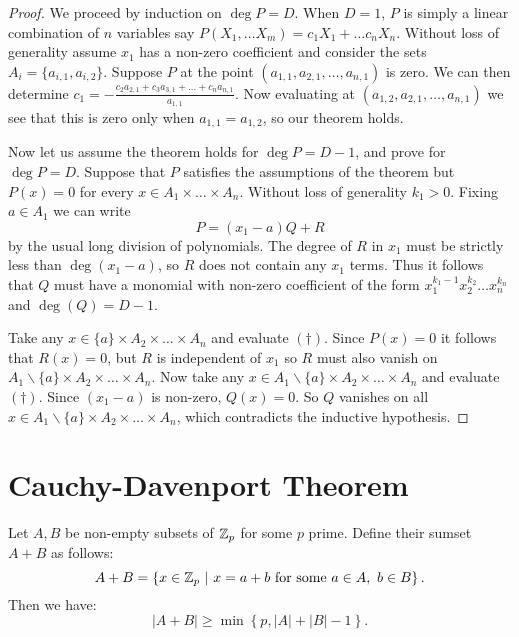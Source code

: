 \begin{proof}
    We proceed by induction on $\deg P = D$. When $D=1$, $P$ is simply a linear combination of $n$ variables say $P(X_1,\dots X_m) = c_1 X_1 + \dots c_n X_n$. Without loss of generality assume $x_1$ has a non-zero coefficient and consider the sets $A_i = \{a_{i,1}, a_{i,2}\}$. Suppose $P$ at the point $(a_{1,1}, a_{2,1}, \dots, a_{n,1})$ is zero. We can then determine $c_{1} =- \frac{c_2 a_{2,1} + c_3 a_{3,1}+\dots+ c_n a_{n,1}}{a_{1,1}}$. Now evaluating at $(a_{1,2}, a_{2,1}, \dots, a_{n,1})$ we see that this is zero only when $a_{1,1} = a_{1,2}$, so our theorem holds. 

    Now let us assume the theorem holds for $\deg P = D -1$, and prove for $\deg P = D$.
    Suppose that $P$ satisfies the assumptions of the theorem but $P(x) = 0$ for every $x \in A_1 \times \dots \times A_n$.
    Without loss of generality $k_1 > 0.$ Fixing $a\in A_1$ we can write
    \[
    P = (x_1-a)Q +R  \tag{$\dagger$}
    \]
    by the usual long division of polynomials. The degree of $R$ in $x_1$ must be strictly less than $\deg(x_1-a)$, so $R$ does not contain any
    $x_1$ terms. Thus it follows that $Q$ must have a monomial with non-zero coefficient of the form $x_1^{k_{1} -1} x_2^{k_2} \dots x_n^{k_n}$ and 
    $\deg (Q) = D-1$.

    Take any $x \in \{a\} \times A_2 \times \dots \times A_n$ and evaluate $(\dagger)$. Since $P(x) = 0$ it follows that $R(x) = 0$, but $R$ is independent of $x_1$ so $R$ must also vanish on $A_1 \backslash \{a\} \times A_2 \times \dots \times A_n$.
    Now take any $x \in A_1 \backslash \{a\} \times A_2 \times \dots \times A_n$ and evaluate $(\dagger)$. Since $(x_1 - a)$ is non-zero, $Q(x) =0$. So $Q$ vanishes on all $x \in A_1 \backslash \{a\} \times A_2 \times \dots \times A_n$, which contradicts the inductive hypothesis.
\end{proof}
\section{Cauchy-Davenport Theorem}
\begin{theorem} 
    Let $A,B$ be non-empty subsets of $\mathbb Z_p$ for some $p$ prime. Define their sumset $A+B$ as follows:
    \[
    A + B = 
    \left\{ x \in \mathbb Z_p\ | \ x = a+b \text{  for some } a\in A, \ b \in B \right\}.
    \]
    Then we have:
    \[
    |A+B| \geq  \min \left\{p, |A| + |B| -1 \right\}.
    \]
\end{theorem} 

